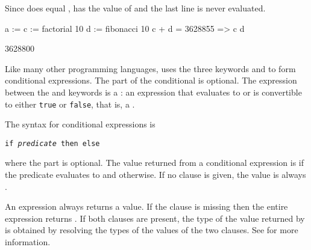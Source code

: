 {\begin{xtc}
\begin{xtccomment}
Since  does equal ,  has the value
of  and the last line is never evaluated.
\end{xtccomment}
\begin{spadsrc}
a :=
  c := factorial 10
  d := fibonacci 10
  c + d = 3628855 => c
  d
\end{spadsrc}
\begin{TeXOutput}
\begin{fricasmath}{11}
3628800%
\end{fricasmath}
\end{TeXOutput}
\end{xtc}


Like many other programming languages, \Language{} uses the three
keywords    and 
 to form
conditional expressions.
The  part of the conditional is optional.
The expression between the  and  keywords
is a
: an expression that evaluates to or is convertible to
either {\tt true} or {\tt false}, that is,
a .

\beginImportant
The syntax for conditional expressions is
\begin{center}
{\tt if {\it predicate} then  else }
\end{center}
where the   part is optional.
The value returned from a conditional expression is
 if the predicate evaluates to 
and  otherwise.
If no  clause is given, the value is always \void{}.
\endImportant

An  expression always returns a value.
If the
 clause is missing then the entire expression returns
\void{}.
If both clauses are present, the type of the value returned by 
is obtained by resolving the types of the values of the two clauses.
See 
for more information.

}
